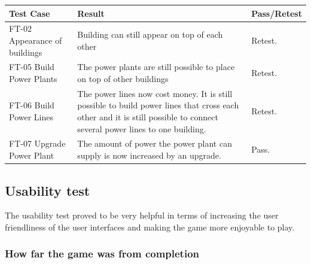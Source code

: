 	\begin{tabular}{| p{3cm} | p{7cm} | p{2cm} |}
		\hline
		\rowcolor{lightgray}
		{\bf Test Case} & {\bf Result} & {\bf Pass/Retest} \\ \hline

		FT-02 Appearance of buildings & Building can still appear on top of each other & Retest. \\ \hline

	  	FT-05 Build Power Plants & The power plants are still possible to place on top of other buildings & Retest. \\ \hline

	  	FT-06 Build Power Lines & The power lines now cost money. It is still possible to build power lines that cross each other and it is still possible to connect several power lines to one building. & Retest. \\ \hline

	  	FT-07 Upgrade Power Plant & The amount of power the power plant can supply is now increased by an upgrade. & Pass. \\ \hline
	\end{tabular}

\subsection{Usability test}

	The usability test proved to be very helpful in terms of increasing the user friendliness of the user interfaces and making the game more enjoyable to play.

	\subsubsection*{How far the game was from completion}

